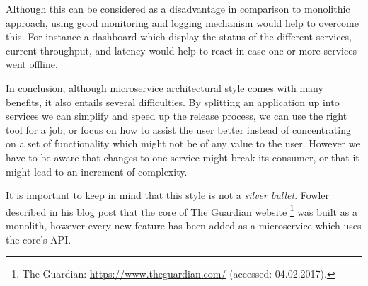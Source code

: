\begin{description}[style=nextline]
Although this can be considered as a disadvantage in comparison to monolithic approach, using good monitoring and logging mechanism would help to overcome this. For instance a dashboard which display the status of the different services, current throughput, and latency would help to react in case one or more services went offline.
\end{description}

In conclusion, although microservice architectural style comes with many benefits, it also entails several difficulties. By splitting an application up into services we can simplify and speed up the release process, we can use the right tool for a job, or focus on how to assist the user better instead of concentrating on a set of functionality which might not be of any value to the user. However we have to be aware that changes to one service might break its consumer, or that it might lead to an increment of complexity.

It is important to keep in mind that this style is not a \emph{silver bullet}. Fowler described in his blog post \cite{Fowler2014} that the core of The Guardian website \footnote{The Guardian: \url{https://www.theguardian.com/} (accessed: 04.02.2017).} was built as a monolith, however every new feature has been added as a microservice which uses the core's API.